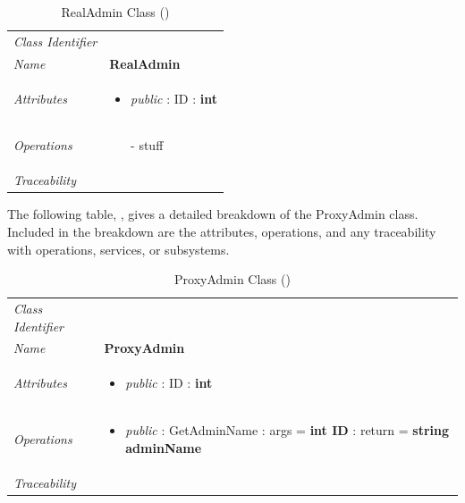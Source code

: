 \documentclass[12pt,letterpaper]{article}
\begin{document}
\begin{table}[H]
    \caption{RealAdmin Class ()} 
	\begin{tabu} to 
		\toprule
		Class Identifier &  \\
		Name & {\bf RealAdmin} \\
		Attributes & 
		\begin{minipage}[t]{\linewidth}
		    \begin{itemize}
		        \item \textit{public} : ID : \bf{int}
			\end{itemize}
	    \end{minipage} \\

		Operations &
		\begin{minipage}[t]{\linewidth}
			\begin{enumerate}
			    \item[-] stuff
	        \end{enumerate}
	    \end{minipage} \\
	    	Traceability & \\
		\toprule
	\end{tabu}
\end{table}

The following table, , gives a detailed breakdown of the ProxyAdmin class. Included in the breakdown are the attributes, operations, and any traceability with operations, services, or subsystems.

\begin{table}[H]
    \caption{ProxyAdmin Class ()} 
	\begin{tabu} to 
		\toprule
		Class Identifier &  \\
		Name & {\bf ProxyAdmin} \\
		Attributes & 
		\begin{minipage}[t]{\linewidth}
		    \begin{itemize}
		        \item \textit{public} : ID : \bf{int}
			\end{itemize}
	    \end{minipage} \\

		Operations &
		\begin{minipage}[t]{\linewidth}
			\begin{itemize}
			    \item \textit{public} : GetAdminName : args = {\bf int ID} : return = {\bf string adminName}
	        \end{itemize}
	    \end{minipage} \\
	    	Traceability & \\
		\toprule
	\end{tabu}
\end{table}
\end{document}
